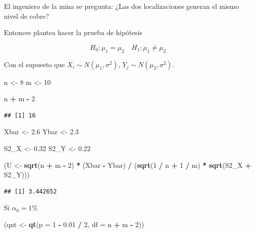\documentclass[
  12pt,
]{book}
\newenvironment{Shaded}{\begin{snugshade}}{\end{snugshade}}
\newcommand{\DataTypeTok}[1]{\textcolor[rgb]{0.13,0.29,0.53}{#1}}
\newcommand{\DecValTok}[1]{\textcolor[rgb]{0.00,0.00,0.81}{#1}}
\newcommand{\FloatTok}[1]{\textcolor[rgb]{0.00,0.00,0.81}{#1}}
\newcommand{\KeywordTok}[1]{\textcolor[rgb]{0.13,0.29,0.53}{\textbf{#1}}}
\newcommand{\NormalTok}[1]{#1}
\newcommand{\OperatorTok}[1]{\textcolor[rgb]{0.81,0.36,0.00}{\textbf{#1}}}
\newcommand{\StringTok}[1]{\textcolor[rgb]{0.31,0.60,0.02}{#1}}
\begin{document}
El ingeniero de la mina se pregunta: ¿Las dos localizaciones generan el mismo
nivel de cobre?

Entonces plantea hacer la prueba de hipótesis

\[
H_0: \mu_1=\mu_2 \quad H_1: \mu_1\neq\mu_2 
\]

Con el supuesto que \(X_i\sim N(\mu_1,\sigma^2)\), \(Y_j\sim N(\mu_2,\sigma^2)\).

\begin{Shaded}
\begin{Highlighting}[]
\NormalTok{n \textless{}{-}}\StringTok{ }\DecValTok{8}
\NormalTok{m \textless{}{-}}\StringTok{ }\DecValTok{10}

\NormalTok{n }\OperatorTok{+}\StringTok{ }\NormalTok{m }\OperatorTok{{-}}\StringTok{ }\DecValTok{2}
\end{Highlighting}
\end{Shaded}

\begin{verbatim}
## [1] 16
\end{verbatim}

\begin{Shaded}
\begin{Highlighting}[]
\NormalTok{Xbar \textless{}{-}}\StringTok{ }\FloatTok{2.6}
\NormalTok{Ybar \textless{}{-}}\StringTok{ }\FloatTok{2.3}

\NormalTok{S2\_X \textless{}{-}}\StringTok{ }\FloatTok{0.32}
\NormalTok{S2\_Y \textless{}{-}}\StringTok{ }\FloatTok{0.22}

\NormalTok{(U \textless{}{-}}\StringTok{ }\KeywordTok{sqrt}\NormalTok{(n }\OperatorTok{+}\StringTok{ }\NormalTok{m }\OperatorTok{{-}}\StringTok{ }\DecValTok{2}\NormalTok{) }\OperatorTok{*}\StringTok{ }\NormalTok{(Xbar }\OperatorTok{{-}}\StringTok{ }\NormalTok{Ybar) }\OperatorTok{/}
\StringTok{  }\NormalTok{(}\KeywordTok{sqrt}\NormalTok{(}\DecValTok{1} \OperatorTok{/}\StringTok{ }\NormalTok{n }\OperatorTok{+}\StringTok{ }\DecValTok{1} \OperatorTok{/}\StringTok{ }\NormalTok{m) }\OperatorTok{*}\StringTok{ }\KeywordTok{sqrt}\NormalTok{(S2\_X }\OperatorTok{+}\StringTok{ }\NormalTok{S2\_Y)))}
\end{Highlighting}
\end{Shaded}

\begin{verbatim}
## [1] 3.442652
\end{verbatim}

Si \(\alpha_0 = 1\%\)

\begin{Shaded}
\begin{Highlighting}[]
\NormalTok{(qnt \textless{}{-}}\StringTok{ }\KeywordTok{qt}\NormalTok{(}\DataTypeTok{p =} \DecValTok{1} \OperatorTok{{-}}\StringTok{ }\FloatTok{0.01} \OperatorTok{/}\StringTok{ }\DecValTok{2}\NormalTok{, }\DataTypeTok{df =}\NormalTok{ n }\OperatorTok{+}\StringTok{ }\NormalTok{m }\OperatorTok{{-}}\StringTok{ }\DecValTok{2}\NormalTok{))}
\end{Highlighting}
\end{Shaded}
\end{document}
